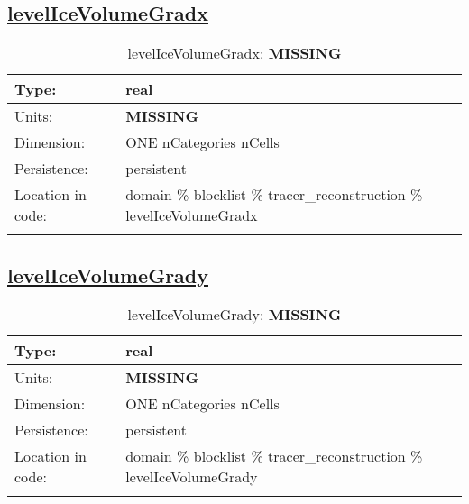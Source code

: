 \subsection[levelIceVolumeGradx]{\hyperref[sec:var_tab_tracer_reconstruction]{levelIceVolumeGradx}}
\label{subsec:var_sec_tracer_reconstruction_levelIceVolumeGradx}
\begin{center}
\begin{longtable}{| p{2.0in} | p{4.0in} |}
        \hline 
        Type: & real \\
        \hline 
        Units: & {\bf \color{red} MISSING} \\
        \hline 
        Dimension: & ONE nCategories nCells \\
        \hline 
        Persistence: & persistent \\
        \hline 
         Location in code: & domain \% blocklist \% tracer\_reconstruction \% levelIceVolumeGradx \\
         \hline 
    \caption{levelIceVolumeGradx: {\bf \color{red} MISSING}}
\end{longtable}
\end{center}
\subsection[levelIceVolumeGrady]{\hyperref[sec:var_tab_tracer_reconstruction]{levelIceVolumeGrady}}
\label{subsec:var_sec_tracer_reconstruction_levelIceVolumeGrady}
\begin{center}
\begin{longtable}{| p{2.0in} | p{4.0in} |}
        \hline 
        Type: & real \\
        \hline 
        Units: & {\bf \color{red} MISSING} \\
        \hline 
        Dimension: & ONE nCategories nCells \\
        \hline 
        Persistence: & persistent \\
        \hline 
         Location in code: & domain \% blocklist \% tracer\_reconstruction \% levelIceVolumeGrady \\
         \hline 
    \caption{levelIceVolumeGrady: {\bf \color{red} MISSING}}
\end{longtable}
\end{center}
